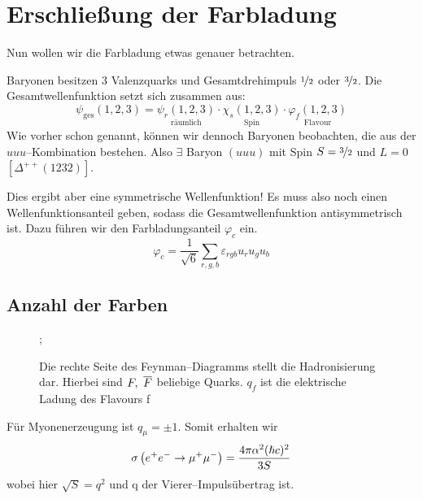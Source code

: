 \documentclass[Ex4_Zusammenfassung.tex]{subfiles}
\begin{document}
\section{Erschließung der Farbladung}
Nun wollen wir die Farbladung etwas genauer betrachten.

Baryonen besitzen 3 Valenzquarks und Gesamtdrehimpuls $\nicefrac{1}{2}$ oder $\nicefrac{3}{2}$. Die Gesamtwellenfunktion setzt sich zusammen aus:
\begin{equation}
	\psi_\text{ges}(1,2,3) =\underset{\text{räumlich}}{\psi_r(1,2,3)} \cdot \underset{\text{Spin}}{\chi_s (1,2,3)} \cdot \underset{\text{Flavour}}{\varphi_f (1,2,3)}
\end{equation}
Wie vorher schon genannt, können wir dennoch Baryonen beobachten, die aus der $uuu$--Kombination bestehen. Also $\exists$ Baryon $(uuu)$ mit Spin $S=\nicefrac{3}{2}$ und $L=0$ $\left[ \Delta^{++} (1232) \right]$.

Dies ergibt aber eine symmetrische Wellenfunktion! Es muss also noch einen Wellenfunktionsanteil geben, sodass die Gesamtwellenfunktion antisymmetrisch ist. Dazu führen wir den Farbladungsanteil $\varphi_c$ ein. 
\begin{equation}
	\varphi_c = \frac{1}{\sqrt{6}} \sum_{r,g,b} \varepsilon_{rgb} u_r u_g u_b
\end{equation}
\subsection{Anzahl der Farben}
\begin{figure}[H]
	\centering
	;
	\caption{Die rechte Seite des Feynman--Diagramms stellt die Hadronisierung dar. Hierbei sind $F,\ \ol{F}$ beliebige Quarks. $q_f$ ist die elektrische Ladung des Flavours f}
\end{figure}
Für Myonenerzeugung ist $q_\mu = \pm 1$. Somit erhalten wir
\begin{equation}
	\sigma\left( e^+ e^- \rightarrow \mu^+ \mu^- \right) = \frac{4\pi \alpha^2 (\hslash c)^2}{3S}
\end{equation}
wobei hier $\sqrt{S}=q^2$ und q der Vierer--Impulsübertrag ist.
\end{document}
